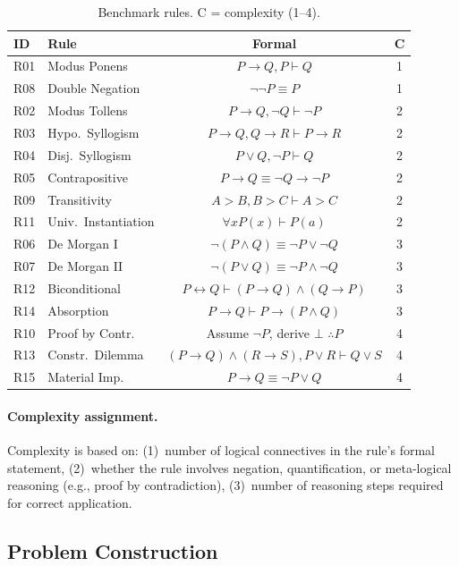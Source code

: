 \documentclass{article}
\begin{document}
\begin{table}[t]
\centering
\small
\begin{tabular}{llcc}
\toprule
\textbf{ID} & \textbf{Rule} & \textbf{Formal} & \textbf{C} \\
\midrule
R01 & Modus Ponens & $P{\to}Q, P \vdash Q$ & 1 \\
R08 & Double Negation & $\neg\neg P \equiv P$ & 1 \\
R02 & Modus Tollens & $P{\to}Q, \neg Q \vdash \neg P$ & 2 \\
R03 & Hypo.\ Syllogism & $P{\to}Q, Q{\to}R \vdash P{\to}R$ & 2 \\
R04 & Disj.\ Syllogism & $P{\lor}Q, \neg P \vdash Q$ & 2 \\
R05 & Contrapositive & $P{\to}Q \equiv \neg Q{\to}\neg P$ & 2 \\
R09 & Transitivity & $A{>}B, B{>}C \vdash A{>}C$ & 2 \\
R11 & Univ.\ Instantiation & $\forall x P(x) \vdash P(a)$ & 2 \\
R06 & De Morgan I & $\neg(P{\land}Q) \equiv \neg P{\lor}\neg Q$ & 3 \\
R07 & De Morgan II & $\neg(P{\lor}Q) \equiv \neg P{\land}\neg Q$ & 3 \\
R12 & Biconditional & $P{\leftrightarrow}Q \vdash (P{\to}Q){\land}(Q{\to}P)$ & 3 \\
R14 & Absorption & $P{\to}Q \vdash P{\to}(P{\land}Q)$ & 3 \\
R10 & Proof by Contr. & Assume $\neg P$, derive $\bot$ $\therefore P$ & 4 \\
R13 & Constr.\ Dilemma & $(P{\to}Q){\land}(R{\to}S), P{\lor}R \vdash Q{\lor}S$ & 4 \\
R15 & Material Imp. & $P{\to}Q \equiv \neg P{\lor}Q$ & 4 \\
\bottomrule
\end{tabular}
\caption{Benchmark rules. C = complexity (1--4).}
\label{tab:rules}
\end{table}

\paragraph{Complexity assignment.}
Complexity is based on:
(1)~number of logical connectives in the rule's formal statement,
(2)~whether the rule involves negation, quantification, or
meta-logical reasoning (e.g., proof by contradiction),
(3)~number of reasoning steps required for correct application.

\subsection{Problem Construction}
\end{document}
